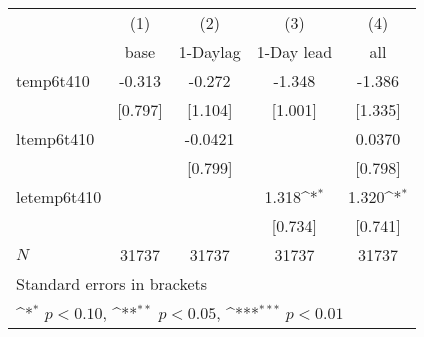 {
\def\sym#1{\ifmmode^{#1}\else\(^{#1}\)\fi}
\begin{tabular}{l*{4}{c}}
\hline\hline
            &\multicolumn{1}{c}{(1)}&\multicolumn{1}{c}{(2)}&\multicolumn{1}{c}{(3)}&\multicolumn{1}{c}{(4)}\\
            &\multicolumn{1}{c}{base}&\multicolumn{1}{c}{1-Daylag}&\multicolumn{1}{c}{1-Day lead}&\multicolumn{1}{c}{all}\\
\hline
temp6t410   &      -0.313         &      -0.272         &      -1.348         &      -1.386         \\
            &     [0.797]         &     [1.104]         &     [1.001]         &     [1.335]         \\
[1em]
ltemp6t410  &                     &     -0.0421         &                     &      0.0370         \\
            &                     &     [0.799]         &                     &     [0.798]         \\
[1em]
letemp6t410 &                     &                     &       1.318\sym{*}  &       1.320\sym{*}  \\
            &                     &                     &     [0.734]         &     [0.741]         \\
\hline
\(N\)       &       31737         &       31737         &       31737         &       31737         \\
\hline\hline
\multicolumn{5}{l}{\footnotesize Standard errors in brackets}\\
\multicolumn{5}{l}{\footnotesize \sym{*} \(p<0.10\), \sym{**} \(p<0.05\), \sym{***} \(p<0.01\)}\\
\end{tabular}
}
